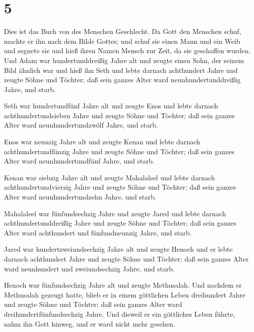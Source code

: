 \hypertarget{section-4}{%
\section{5}\label{section-4}}

 Dies ist das Buch von des Menschen Geschlecht. Da Gott den
Menschen schuf, machte er ihn nach dem Bilde Gottes;  und
schuf sie einen Mann und ein Weib und segnete sie und hieß ihren Namen
Mensch zur Zeit, da sie geschaffen wurden.  Und Adam war
hundertunddreißig Jahre alt und zeugte einen Sohn, der seinem Bild
ähnlich war und hieß ihn Seth  und lebte darnach achthundert
Jahre und zeugte Söhne und Töchter;  daß sein ganzes Alter
ward neunhundertunddreißig Jahre, und starb.

 Seth war hundertundfünf Jahre alt und zeugte Enos
 und lebte darnach achthundertundsieben Jahre und zeugte
Söhne und Töchter;  daß sein ganzes Alter ward
neunhundertundzwölf Jahre, und starb.

 Enos war neunzig Jahre alt und zeugte Kenan 
und lebte darnach achthundertundfünzig Jahre und zeugte Söhne und
Töchter;  daß sein ganzes Alter ward neunhundertundfünf
Jahre, und starb.

 Kenan war siebzig Jahre alt und zeugte Mahalaleel
 und lebte darnach achthundertundvierzig Jahre und zeugte
Söhne und Töchter;  daß sein ganzes Alter ward
neunhundertundzehn Jahre, und starb.

 Mahalaleel war fünfundsechzig Jahre und zeugte Jared
 und lebte darnach achthundertunddreißig Jahre und zeugte
Söhne und Töchter;  daß sein ganzes Alter ward achthundert
und fünfundneunzig Jahre, und starb.

 Jared war hundertzweiundsechzig Jahre alt und zeugte
Henoch  und er lebte darnach achthundert Jahre und zeugte
Söhne und Töchter;  daß sein ganzes Alter ward neunhundert
und zweiundsechzig Jahre, und starb.

 Henoch war fünfundsechzig Jahre alt und zeugte Methusalah.
 Und nachdem er Methusalah gezeugt hatte, blieb er in einem
göttlichen Leben dreihundert Jahre und zeugte Söhne und Töchter;
 daß sein ganzes Alter ward dreihundertfünfundsechzig
Jahre.  Und dieweil er ein göttliches Leben führte, nahm
ihn Gott hinweg, und er ward nicht mehr gesehen.

